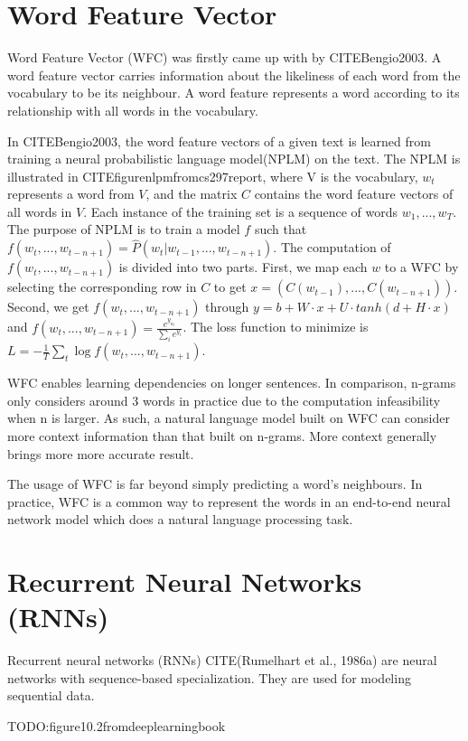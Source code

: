 \documentclass[modernstyle,12pt]{sjsuthesis}
\theoremstyle{definition}
\begin{document}
\section{Word Feature Vector}
Word Feature Vector (WFC) was firstly came up with by CITEBengio2003. A word feature vector carries information about the likeliness of each word from the vocabulary to be its neighbour. A word feature represents a word according to its relationship with all words in the vocabulary.

In CITEBengio2003, the word feature vectors of a given text is learned from training a neural probabilistic language model(NPLM) on the text. The NPLM is illustrated in CITEfigurenlpmfromcs297report, where V is the vocabulary, $w_t$ represents a word from $V$, and the matrix $C$ contains the word feature vectors of all words in $V$. Each instance of the training set is a sequence of words $w_1,...,w_T$. The purpose of NPLM is to train a model $f$ such that $ f(w_t, ..., w_{t-n+1}) = \hat{P}(w_t | w_{t-1},...,w_{t-n+1})$. The computation of $f(w_t, ..., w_{t-n+1})$ is divided into two parts.
First, we map each $w$ to a WFC by selecting the corresponding row in $C$ to get $x=(C(w_{t-1}),... ,C(w_{t-n+1}))$. Second, we get $f(w_t, ..., w_{t-n+1})$ through $y=b+W\cdot x + U\cdot tanh(d + H\cdot x)$ and $ f(w_t, ..., w_{t-n+1}) = \frac{e^{y_{w_t}}}{\sum_{i}^{}e^{y_i}}$. The loss function to minimize is $L = -\frac{1}{T}\sum _{t}^{} \log{f(w_t, ..., w_{t-n+1})}$.


WFC enables learning dependencies on longer sentences. In comparison, n-grams only considers around 3 words in practice due to the computation infeasibility when n is larger. As such, a natural language model built on WFC can consider more context information than that built on n-grams. More context generally brings more more accurate result.

The usage of WFC is far beyond simply predicting a word's neighbours. In practice, WFC is a common way to represent the words in an end-to-end neural network model which does a natural language processing task.
\section{Recurrent Neural Networks (RNNs)}
Recurrent neural networks (RNNs) CITE(Rumelhart et al., 1986a) are neural networks with sequence-based specialization. They are used for modeling sequential data.

TODO:figure10.2fromdeeplearningbook
\end{document}
